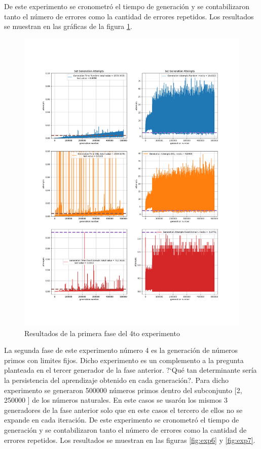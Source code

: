 De este experimento se cronometró el tiempo de generación y se contabilizaron tanto el número de errores como la
cantidad de errores repetidos. Los resultados se muestran en las gráficas de la figura \ref{fig:exp5}.

\begin{figure}[H]
      \includegraphics[width=\linewidth]{Graphics/exp5.png}
      \caption{Resultados de la primera fase del 4to experimento}
      \label{fig:exp5}
\end{figure}

La segunda fase de este experimento número 4 es la generación de números primos con limites fijos. Dicho experimento
es un complemento a la pregunta planteada en el tercer generador de la fase anterior. ?`Qué tan determinante sería
la persistencia del aprendizaje obtenido en cada generación?. Para dicho experimento se generaron 500000 números primos
dentro del subconjunto [2, 250000 ] de los números naturales. En este casos se usarón los mismos 3 generadores de la
fase anterior solo que en este casos el tercero de ellos no se expande en cada iteración. De este experimento se cronometró
el tiempo de generación y se contabilizaron tanto el número de errores como la cantidad de errores repetidos. Los resultados
se muestran en las figuras \ref{fig:exp6} y \ref{fig:exp7}.

